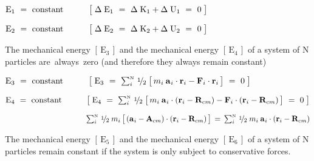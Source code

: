 \documentclass[10pt]{article}
\newcommand{\med}{\raise.5ex\hbox{$\scriptstyle 1$}\kern-.15em/\kern-.09em\lower.25ex\hbox{$\scriptstyle 2$}}
\begin{document}
\par \bigskip\medskip ${\mathrm{E}}_1 ~=~ {\mathrm{constant}} \hspace{+3.00em} \big [ \; \Delta \; {\mathrm{E}}_1 ~=~ \Delta \; {\mathrm{K}}_1 + \Delta \; {\mathrm{U}}_1 ~=~ 0 \; \big ]$

\par \bigskip ${\mathrm{E}}_2 ~=~ {\mathrm{constant}} \hspace{+3.00em} \big [ \; \Delta \; {\mathrm{E}}_2 ~=~ \Delta \; {\mathrm{K}}_2 + \Delta \; {\mathrm{U}}_2 ~=~ 0 \; \big ]$

\par \bigskip\medskip \noindent The mechanical energy $[ \, {\mathrm{E}}_3 \, ]$ and the mechanical energy $[ \, {\mathrm{E}}_4 \, ]$ of a system of N particles \hbox {are always zero} (\hspace{+0.180em}and therefore they always remain constant\hspace{+0.180em})

\par \bigskip\medskip ${\mathrm{E}}_3 ~=~ {\mathrm{constant}} \hspace{+3.00em} \big [ \; {\mathrm{E}}_3 ~=~ \sum_i^{\scriptscriptstyle{\mathrm{N}}} \, \med \; \big [ \, m_i \: {\mathbf{a}}_{\hspace{+0.045em}i} \cdot {\mathbf{r}}_{i} - {\mathbf{F}}_i \cdot {\mathbf{r}}_{i} \, \big ] ~=~ 0 \; \big ]$

\par \bigskip ${\mathrm{E}}_4 ~=~ {\mathrm{constant}} \hspace{+3.00em} \big [ \; {\mathrm{E}}_4 ~=~ \sum_i^{\scriptscriptstyle{\mathrm{N}}} \, \med \; \big [ \, m_i \: {\mathbf{a}}_{\hspace{+0.045em}i} \cdot ({\mathbf{r}}_{i} - {\mathbf{R}}_{cm}) - {\mathbf{F}}_i \cdot ({\mathbf{r}}_{i} - {\mathbf{R}}_{cm}) \, \big ] ~=~ 0 \; \big ]$

\par \bigskip $\hspace{+10.44em} \sum_i^{\scriptscriptstyle{\mathrm{N}}} \, \med \; m_i \, \big [ \, ({\mathbf{a}}_{\hspace{+0.045em}i} - {\mathbf{A}}_{cm}) \cdot ({\mathbf{r}}_{i} - {\mathbf{R}}_{cm}) \, \big ] \,=\, \sum_i^{\scriptscriptstyle{\mathrm{N}}} \, \med \; m_i \: {\mathbf{a}}_{\hspace{+0.045em}i} \cdot ({\mathbf{r}}_{i} - {\mathbf{R}}_{cm})$

\par \bigskip\medskip \noindent The mechanical energy $[ \, {\mathrm{E}}_5 \, ]$ and the mechanical energy $[ \, {\mathrm{E}}_6 \, ]$ of a system of N particles remain constant if the system is only subject to conservative forces.
\end{document}

